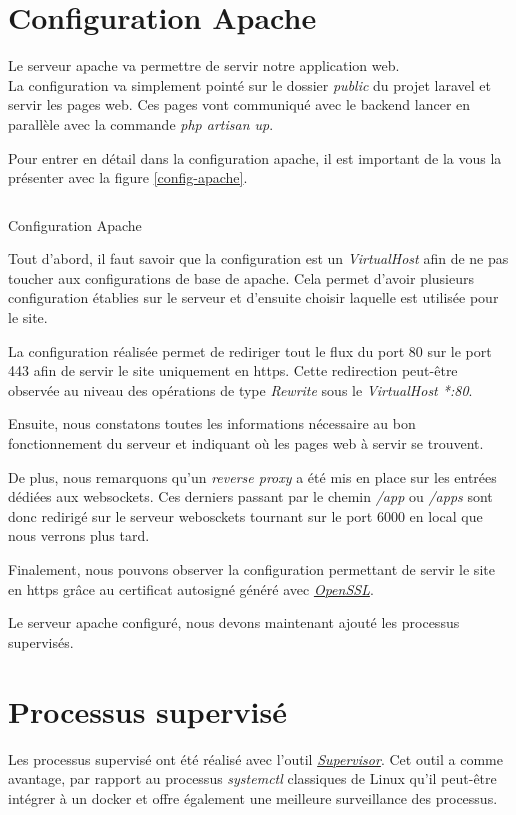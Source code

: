 \documentclass[
    iai, %
    il, %
]{heig-tb}
\begin{document}
\section{Configuration Apache}
Le serveur \Gls{apache} va permettre de servir notre application web. \\
La configuration va simplement pointé sur le dossier \emph{public} du projet \Gls{laravel} et servir les pages web. Ces pages vont communiqué avec le \Gls{backend} lancer en parallèle avec la commande \emph{php artisan up}.

Pour entrer en détail dans la configuration \Gls{apache}, il est important de la vous la présenter avec la figure \ref{config-apache}.

\begin{listing}[H]
    \inputminted{conf}{assets/code/config-apache.conf}
    \caption{Configuration Apache \label{config-apache}}
\end{listing}

Tout d'abord, il faut savoir que la configuration est un \emph{VirtualHost} afin de ne pas toucher aux configurations de base de \Gls{apache}. Cela permet d'avoir plusieurs configuration établies sur le serveur et d'ensuite choisir laquelle est utilisée pour le site.

La configuration réalisée permet de rediriger tout le flux du port 80 sur le port 443 afin de servir le site uniquement en \Gls{https}. Cette redirection peut-être observée au niveau des opérations de type \emph{Rewrite} sous le \emph{VirtualHost *:80}.

Ensuite, nous constatons toutes les informations nécessaire au bon fonctionnement du serveur et indiquant où les pages web à servir se trouvent.

De plus, nous remarquons qu'un \emph{reverse proxy} a été mis en place sur les entrées dédiées aux \Gls{websockets}. Ces derniers passant par le chemin \emph{/app} ou \emph{/apps} sont donc redirigé sur le serveur webosckets tournant sur le port 6000 en local que nous verrons plus tard.

Finalement, nous pouvons observer la configuration permettant de servir le site en  \Gls{https} grâce au certificat autosigné généré avec \href{https://www.openssl.org/}{\emph{OpenSSL}}.

Le serveur \Gls{apache} configuré, nous devons maintenant ajouté les processus supervisés.

\section{Processus supervisé}
Les processus supervisé ont été réalisé avec l'outil \href{http://supervisord.org/}{\emph{Supervisor}}. Cet outil a comme avantage, par rapport au processus \emph{systemctl} classiques de Linux qu'il peut-être intégrer à un \Gls{docker} et offre également une meilleure surveillance des processus.
\end{document}
